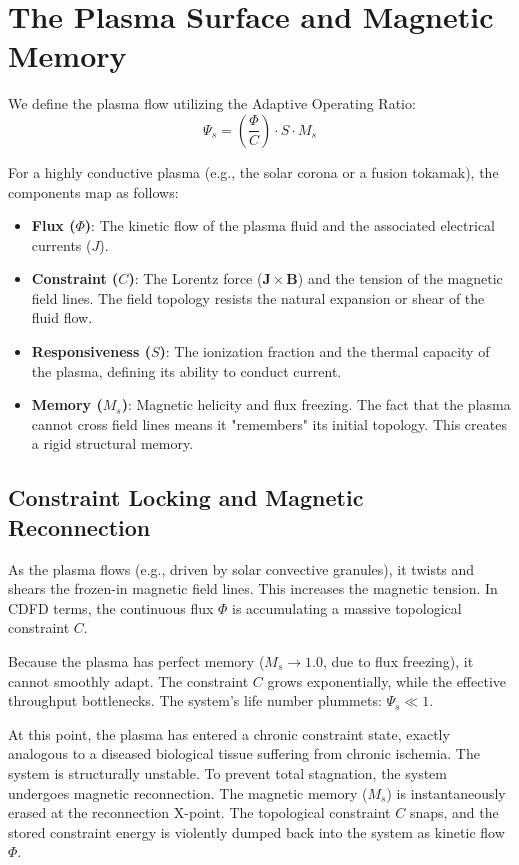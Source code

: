 \documentclass[11pt,a4paper]{article}
\begin{document}
\section{The Plasma Surface and Magnetic Memory}
We define the plasma flow utilizing the Adaptive Operating Ratio:
\begin{equation}
    \Psi_s = \left( \frac{\Phi}{C} \right) \cdot S \cdot M_s
\end{equation}

For a highly conductive plasma (e.g., the solar corona or a fusion tokamak), the components map as follows:
\begin{itemize}
    \item \textbf{Flux ($\Phi$)}: The kinetic flow of the plasma fluid and the associated electrical currents ($J$).
    \item \textbf{Constraint ($C$)}: The Lorentz force ($\mathbf{J} \times \mathbf{B}$) and the tension of the magnetic field lines. The field topology resists the natural expansion or shear of the fluid flow.
    \item \textbf{Responsiveness ($S$)}: The ionization fraction and the thermal capacity of the plasma, defining its ability to conduct current.
    \item \textbf{Memory ($M_s$)}: Magnetic helicity and flux freezing. The fact that the plasma cannot cross field lines means it "remembers" its initial topology. This creates a rigid structural memory.
\end{itemize}

\subsection{Constraint Locking and Magnetic Reconnection}
As the plasma flows (e.g., driven by solar convective granules), it twists and shears the frozen-in magnetic field lines. This increases the magnetic tension. In CDFD terms, the continuous flux $\Phi$ is accumulating a massive topological constraint $C$.

Because the plasma has perfect memory ($M_s \to 1.0$, due to flux freezing), it cannot smoothly adapt. The constraint $C$ grows exponentially, while the effective throughput bottlenecks. The system's life number plummets: $\Psi_s \ll 1$.

At this point, the plasma has entered a chronic constraint state, exactly analogous to a diseased biological tissue suffering from chronic ischemia. The system is structurally unstable. To prevent total stagnation, the system undergoes magnetic reconnection. The magnetic memory ($M_s$) is instantaneously erased at the reconnection X-point. The topological constraint $C$ snaps, and the stored constraint energy is violently dumped back into the system as kinetic flow $\Phi$.
\end{document}
